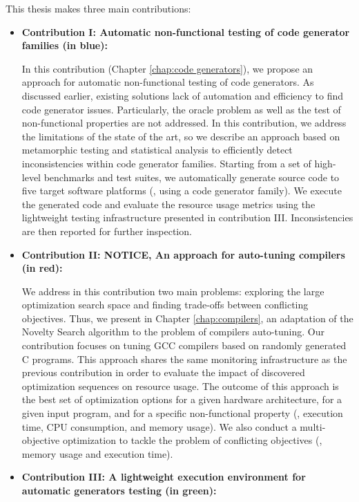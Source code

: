 This thesis makes three main contributions:
\begin{itemize}
	\item \textbf{Contribution I: Automatic non-functional testing of code generator families (in blue): }
	
	In this contribution (Chapter \ref{chap:code generators}), we propose an approach for automatic non-functional  testing of code generators. As discussed earlier, existing solutions lack of automation and efficiency to find code generator issues. Particularly, the oracle problem as well as the test of non-functional properties are not addressed. In this contribution, we address the limitations of the state of the art, so we describe an approach based on metamorphic testing and statistical analysis to efficiently detect inconsistencies within code generator families.
	Starting from a set of high-level benchmarks and test suites, we automatically generate source code to five target software platforms (\ie, using a code generator family). We execute the generated code and evaluate the resource usage metrics using the lightweight testing infrastructure presented in contribution III. Inconsistencies are then reported for further inspection.  
	
	\item \textbf{Contribution II: NOTICE, An approach for auto-tuning compilers (in red):}
	
	We address in this contribution two main problems: exploring the large optimization search space and finding trade-offs between conflicting objectives. 
	Thus, we present in Chapter \ref{chap:compilers}, an adaptation of the Novelty Search algorithm to the problem of compilers auto-tuning. Our contribution focuses on tuning GCC compilers based on randomly generated C programs.
	This approach shares the same monitoring infrastructure as the previous contribution in order to evaluate the impact of discovered optimization sequences on resource usage. The outcome of this approach is the best set of optimization options for a given hardware architecture, for a given input program, and for a specific non-functional property (\ie, execution time, CPU consumption, and memory usage). We also conduct a multi-objective optimization to tackle the problem of conflicting objectives (\eg, memory usage and execution time).
	
	\item \textbf{Contribution III: A lightweight execution environment for automatic generators testing (in green):}
	

\end{itemize}

